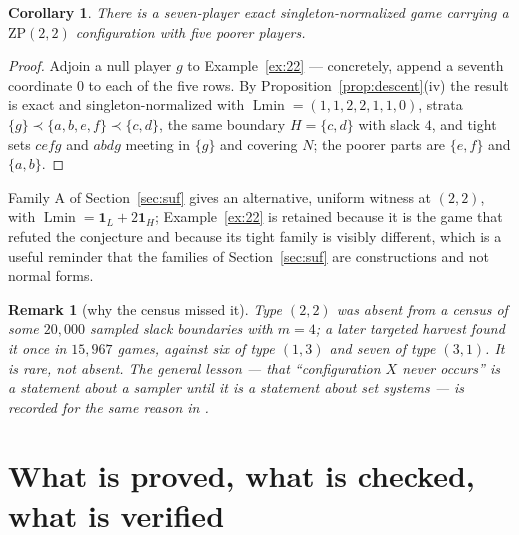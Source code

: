 \documentclass[11pt]{article}
\newtheorem{corollary}[theorem]{Corollary}
\newtheorem{remark}[theorem]{Remark}
\newcommand{\Lmin}{\operatorname{Lmin}}
\newcommand{\one}{\mathbf 1}
\begin{document}
\begin{corollary}\label{cor:zp7}
There is a seven-player exact singleton-normalized game carrying a
$\mathrm{ZP}(2,2)$ configuration with five poorer players.
\end{corollary}

\begin{proof}
Adjoin a null player $g$ to Example~\ref{ex:22} --- concretely, append a
seventh coordinate $0$ to each of the five rows.  By
Proposition~\ref{prop:descent}(iv) the result is exact and singleton-normalized
with $\Lmin=(1,1,2,2,1,1,0)$, strata $\{g\}\prec\{a,b,e,f\}\prec\{c,d\}$, the
same boundary $H=\{c,d\}$ with slack $4$, and tight sets $cefg$ and $abdg$
meeting in $\{g\}$ and covering $N$; the poorer parts are $\{e,f\}$ and
$\{a,b\}$.
\end{proof}

Family A of Section~\ref{sec:suf} gives an alternative, uniform witness at
$(2,2)$, with $\Lmin=\one_L+2\one_H$; Example~\ref{ex:22} is retained because
it is the game that refuted the conjecture and because its tight family is
visibly different, which is a useful reminder that the families of
Section~\ref{sec:suf} are constructions and not normal forms.

\begin{remark}[why the census missed it]
Type $(2,2)$ was absent from a census of some $20{,}000$ sampled slack
boundaries with $m=4$; a later targeted harvest found it once in $15{,}967$
games, against six of type $(1,3)$ and seven of type $(3,1)$.  It is rare, not
absent.  The general lesson --- that ``configuration $X$ never occurs'' is a
statement about a sampler until it is a statement about set systems --- is
recorded for the same reason in \citep{Flanagan2026phase}.
\end{remark}

\section{What is proved, what is checked, what is verified}\label{sec:status}
\end{document}
